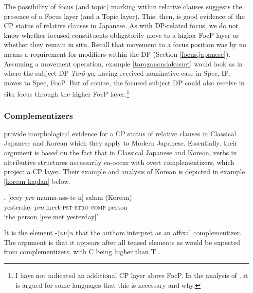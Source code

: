 \largerpage
The possibility of focus (and topic) marking within relative clauses suggests the presence of a Focus layer (and a Topic layer). This, then, is good evidence of the CP status of relative clauses in Japanese. As with DP-related focus, we do not know whether focused constituents obligatorily move to a higher FocP layer or whether they remain in situ. Recall that movement to a focus position was by no means a requirement for modifiers within the DP (Section \ref{focus,japanese}). Assuming a movement operation, example \ref{taroganondakusuri} would look as in  where the subject DP \textit{Tarō-ga}, having received nominative case in Spec, IP, moves to Spec, FocP. But of course, the focused subject DP could also receive in situ focus through the higher FocP layer.\footnote{I have not indicated an additional CP layer above FocP. In the analysis of \citet[57–65]{cinque:2020:relcl}, it is argued for some languages that this is necessary and why.} 

\subsubsection{Complementizers}

\citet{kaplan:1995:the} provide morphological evidence for a CP status of relative clauses in  Classical Japanese and  Korean which they apply to Modern Japanese. Essentially, their argument is based on the fact that in Classical Japanese and Korean, verbs in attributive structures necessarily co-occur with overt complementizers, which project a CP layer. Their example and analysis of  Korean is depicted in example \ref{korean kaplan} below. 

\exg. [ecey \textit{pro} manna-ass-te-n] salam (Korean)\\
yesterday \textit{pro} meet-\textsc{pst-rtro-comp} person\\
`the person [\textit{pro} met yesterday]’ \null \hfill \citep[30]{kaplan:1995:the} \label{korean kaplan}

It is the element -\textsc{(nu)n} that the authors interpret as an affixal complementizer. The argument is that it appears after all tensed elements as would be expected from  complementizers, with C being higher than T \citep[30]{kaplan:1995:the}.

